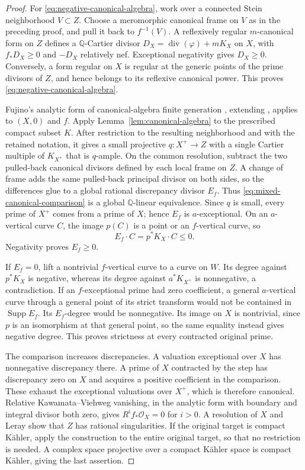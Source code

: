 \documentclass[11pt,a4paper]{article}
\numberwithin{equation}{section}
\theoremstyle{definition}
\theoremstyle{remark}
\newcommand{\Q}{\mathbb Q}\newcommand{\R}{\mathbb R}
\newcommand{\OO}{\mathcal O}\newcommand{\cX}{\mathcal X}
\newcommand{\Supp}{\operatorname{Supp}}\newcommand{\Sing}{\operatorname{Sing}}
\begin{document}
\begin{proof}
For \eqref{eq:negative-canonical-algebra}, work over a connected
Stein neighborhood $V\subset Z$. Choose a meromorphic canonical frame on $V$ as in the preceding
proof, and pull it back to $f^{-1}(V)$. A reflexively regular
$m$-canonical form on $Z$ defines a $\Q$-Cartier divisor
$D_X=\operatorname{div}(\varphi)+mK_X$ on $X$, with
$f_*D_X\ge0$ and $-D_X$ relatively nef. Exceptional negativity
gives $D_X\ge0$. Conversely, a form regular on $X$ is regular at
the generic points of the prime divisors of $Z$, and hence belongs
to its reflexive canonical power. This proves \eqref{eq:negative-canonical-algebra}.

Fujino's analytic form of canonical-algebra finite generation
\cite[Theorem~1.18]{Fujino2022}, extending
\cite[Corollary~1.1.2]{BCHM2010}, applies to $(X,0)$ and $f$.
Apply Lemma~\ref{lem:canonical-algebra} to the prescribed compact
subset $K$. After restriction to the resulting neighborhood and with
the retained notation, it gives a small projective $q:X^+\to Z$
with a single Cartier multiple of $K_{X^+}$ that is $q$-ample.
On the common resolution, subtract the two pulled-back
canonical divisors defined by each local frame on $Z$. A change
of frame adds the same pulled-back principal divisor on both
sides, so the differences glue to a global rational discrepancy
divisor $E_f$. Thus \eqref{eq:mixed-canonical-comparison} is a global
$\Q$-linear equivalence. Since $q$ is small, every prime of $X^+$
comes from a prime of $X$; hence $E_f$ is $a$-exceptional. On an
$a$-vertical curve $C$, the image $p(C)$ is a point or an
$f$-vertical curve, so
\[
 E_f\cdot C=p^*K_X\cdot C\le0.
\]
Negativity proves $E_f\ge0$.

If $E_f=0$, lift a nontrivial $f$-vertical curve to a curve on $W$.
Its degree against $p^*K_X$ is negative, whereas its degree against
$a^*K_{X^+}$ is nonnegative, a contradiction. If an $f$-exceptional
prime had zero coefficient, a general $a$-vertical curve through a
general point of its strict transform would not be contained in
$\Supp E_f$. Its $E_f$-degree would be nonnegative. Its image on
$X$ is nontrivial, since $p$ is an isomorphism at that general point,
so the same equality instead gives negative degree. This proves
strictness at every contracted original prime.

The comparison increases discrepancies. A valuation exceptional over $X$ has nonnegative discrepancy there.
A prime of $X$ contracted by the step has discrepancy zero on $X$
and acquires a positive coefficient in the comparison. These exhaust the exceptional
valuations over $X^+$, which is therefore canonical. Relative
Kawamata--Viehweg vanishing, in the analytic form
\cite[Theorem~5.2]{Fujino2022} with boundary and integral divisor
both zero, gives $R^if_*\OO_X=0$ for $i>0$.
A resolution of $X$ and Leray show that $Z$ has rational
singularities. If the original target is compact Kähler, apply the
construction to the entire original target, so that no restriction is needed.
A complex space projective over a compact Kähler space is compact
Kähler, giving the last assertion.
\end{proof}
\end{document}

